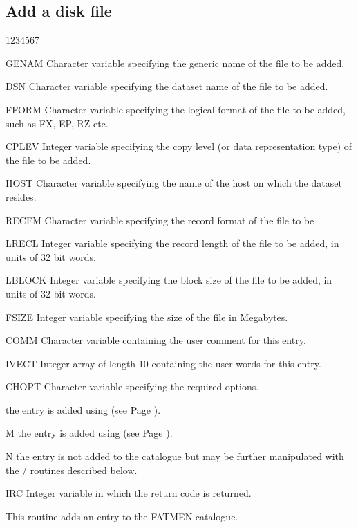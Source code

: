 \subsection{Add a disk file}
\begin{DLtt}{1234567}
\item[GENAM]
Character variable specifying the generic name of the file
to be added.
\item[DSN]
Character variable specifying the dataset name of the file
to be added.
\item[FFORM]
Character variable specifying the logical format of the file
to be added, such as FX, EP, RZ etc.
\item[CPLEV]
Integer variable specifying the copy level (or data representation
type) of the file to be added.
\item[HOST]
Character variable specifying the name of the host on which the
dataset resides.
\item[RECFM]
Character variable specifying the record format of the file to be
\item[LRECL]
Integer variable specifying the record length of the file to be
added, in units of 32 bit words.
\item[LBLOCK]
Integer variable specifying the block size of the file to be
added, in units of 32 bit words.
\item[FSIZE]
Integer variable specifying the size of the file in Megabytes.
\item[COMM]
Character variable containing the user comment for this entry.
\item[IVECT]
Integer array of length 10 containing the user words for this entry.
\item[CHOPT]
Character variable specifying the required options.
\begin{DLtt}{12}
\item[ ]the entry is added using  (see Page \pageref{FMPUT}).
\item[M]the entry is added using  (see Page \pageref{FMMOD}).
\item[N]the entry is not added to the catalogue but may
be further manipulated with the / routines described below.
\end{DLtt}
\item[IRC]
Integer variable in which the return code is returned.
\end{DLtt}
\par
This routine adds an entry to the FATMEN catalogue.

